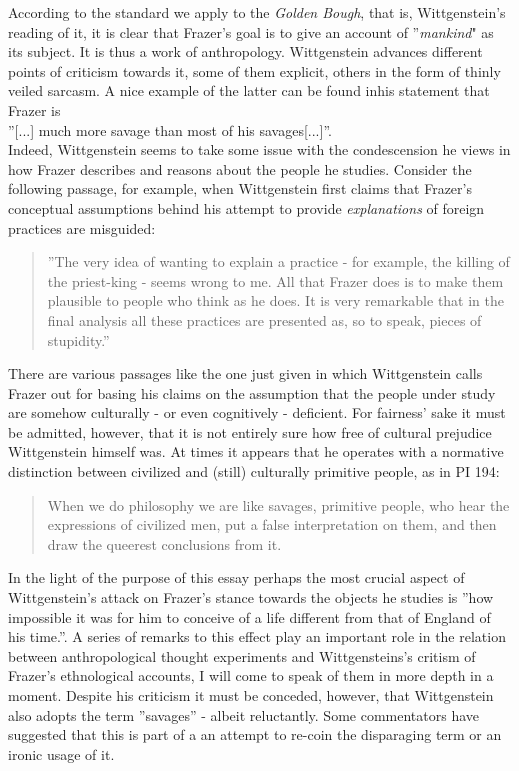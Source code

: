 \documentclass{article}
\begin{document}
According to the standard we apply to the \textit{Golden Bough}, that is, Wittgenstein's reading of it, it is clear that Frazer's goal is to give an account of ''\textit{mankind}" as its subject. It is thus a work of anthropology. Wittgenstein advances different points of criticism towards it, some of them explicit, others in the form of thinly veiled sarcasm. A nice example of the latter can be found inhis statement that Frazer is \\
''[...] much more savage than most of his savages[...]''.\\ %
 Indeed, Wittgenstein seems to take some issue with the condescension he views in how Frazer describes and reasons about the people he studies. Consider the following passage, for example, when Wittgenstein first claims that Frazer's conceptual assumptions behind his attempt to provide \textit{explanations} of foreign practices are misguided:\\
 \begin{quote}
 ''The very idea of wanting to explain a practice - for example, the killing of the priest-king - seems wrong to me. All that Frazer does is to make them plausible to people who think as he does. It is very remarkable that in the final analysis all these practices are presented as, so to speak, pieces of stupidity.''\\ %
 \end{quote}
 There are various passages like the one just given in which Wittgenstein calls Frazer out for basing his claims on the assumption that the people under study are somehow culturally - or even cognitively - deficient. For fairness' sake it must be admitted, however, that it is not entirely sure how free of cultural prejudice Wittgenstein himself was. At times it appears that he operates with a normative distinction between civilized and (still) culturally primitive people, as in PI 194: 
\begin{quote}
When we do philosophy we are like savages, primitive people, who hear the expressions of civilized men, put a false interpretation on them, and then draw the queerest conclusions from it.
\end{quote}
In the light of the purpose of this essay perhaps the most crucial aspect of Wittgenstein's attack on Frazer's stance towards the objects he studies is ''how impossible it was for him to conceive of a life different from that of England of his time.''. A series of remarks to this effect play an important role in the relation between anthropological thought experiments and Wittgensteins's critism of Frazer's ethnological accounts, I will come to speak of them in more depth in a moment.
 Despite his criticism it must be conceded, however, that Wittgenstein also adopts the term ''savages'' - albeit reluctantly. Some commentators have suggested that this is part of a an attempt to re-coin the disparaging term or an ironic usage of it. %
 
\end{document}
